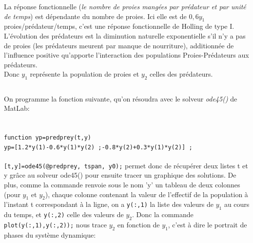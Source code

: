 \documentclass[a4paper,12pt,landscape]{article}
\begin{document}
La réponse fonctionnelle (\textit{le nombre de proies mangées par prédateur et par unité de temps}) est dépendante du nombre de proies. Ici elle est de $0,6y_1$ proies/prédateur/temps, c'est une réponse fonctionnelle de Holling de type I.\\

L'évolution des prédateurs est la diminution naturelle exponentielle s'il n'y a pas de proies (les prédateurs meurent par manque de nourriture), additionnée de l'influence positive qu'apporte l'interaction des populations Proies-Prédateurs aux prédateurs.\\

Donc $y_1$ représente la population de proies et $y_2$ celles des prédateurs.

\subsection{}

On programme la fonction suivante, qu'on résoudra avec le solveur \textit{ode45()} de MatLab:\\
 \\
 \\ 
\texttt{function yp=predprey(t,y)\\
yp=[1.2*y(1)-0.6*y(1)*y(2) ;-0.8*y(2)+0.3*y(1)*y(2)] ;}\\
 \\
\texttt{[t,y]=ode45(@predprey, tspan, y0);} permet donc de récupérer deux listes t et y grâce au solveur ode45() pour ensuite tracer un graphique des solutions.
De plus, comme la commande renvoie sous le nom 'y' un tableau de deux colonnes (pour $y_1$ et $y_2$), chaque colonne contenant la valeur de l'effectif de la population à l'instant t correspondant à la ligne, on a \texttt{y(:,1)} la liste des valeurs de $y_1$ au cours du temps, et \texttt{y(:,2)} celle des valeurs de $y_2$. Donc la commande \texttt{plot(y(:,1),y(:,2));} nous trace $y_2$ en fonction de $y_1$, c'est à dire le portrait de phases du système dynamique:
\end{document}
